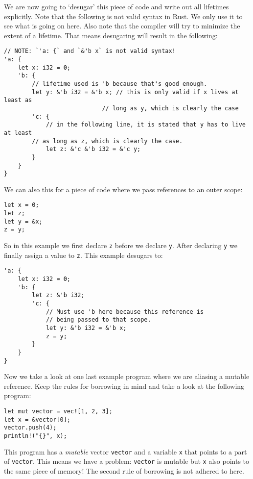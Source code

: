 We are now going to `desugar' this piece of code and write out all lifetimes explicitly. Note that the following is not valid syntax in Rust. We only use it to see what is going on here. Also note that the compiler will try to minimize the extent of a lifetime. That means desugaring will result in the following: 

\begin{verbatim}
// NOTE: `'a: {` and `&'b x` is not valid syntax!
'a: {
    let x: i32 = 0;
    'b: {
        // lifetime used is 'b because that's good enough.
        let y: &'b i32 = &'b x; // this is only valid if x lives at least as 
                            // long as y, which is clearly the case
        'c: {
            // in the following line, it is stated that y has to live at least
        // as long as z, which is clearly the case. 
            let z: &'c &'b i32 = &'c y;
        }
    }
}
\end{verbatim}

We can also this for a piece of code where we pass references to an outer scope:

\begin{verbatim}
let x = 0;
let z;
let y = &x;
z = y;
\end{verbatim}

So in this example we first declare \verb|z| before we declare \verb|y|. After declaring \verb|y| we finally assign a value to \verb|z|. This example desugars to:

\begin{verbatim}
'a: {
    let x: i32 = 0;
    'b: {
        let z: &'b i32;
        'c: {
            // Must use 'b here because this reference is
            // being passed to that scope.
            let y: &'b i32 = &'b x;
            z = y;
        }
    }
}
\end{verbatim}

Now we take a look at one last example program where we are aliasing a mutable reference. Keep the rules for borrowing in mind and take a look at the following program:

\begin{verbatim}
let mut vector = vec![1, 2, 3];
let x = &vector[0];
vector.push(4);
println!("{}", x);
\end{verbatim}

This program has a \textit{mutable} vector \verb|vector| and a variable \verb|x| that points to a part of \verb|vector|. This means we have a problem:  \verb|vector| is mutable but \verb|x| also points to the same piece of memory! The second rule of borrowing is not adhered to here. 


